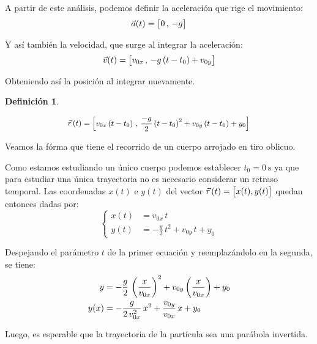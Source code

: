 \documentclass[a5paper,12pt,twoside]{book}
\newtheorem{defn}{{Definición}}[chapter]
\begin{document}
A partir de este análisis, podemos definir la aceleración que rige el movimiento:
\begin{equation*}
    \Vec{a}(t) = { \begin{bmatrix} 0 \, , \, -g \end{bmatrix} }
\end{equation*}

Y así también la velocidad, que surge al integrar la aceleración:
\begin{equation*}
    \Vec{v}(t) = { \begin{bmatrix} v_{0x} \, , \, -g \left(t-t_0\right) + v_{0y} \end{bmatrix} }
\end{equation*}

Obteniendo así la posición al integrar nuevamente.

\begin{mdframed}[style=MyFrame1]
    \begin{defn}
    \end{defn}
    \begin{equation*}
        \scale{0.92}{
        \xyz(t) = \sqb{v_{0x} \left(t-t_0\right) \, , \, \frac{-g}{2} \left(t-t_0\right)^2 + v_{0y} \left(t-t_0\right) + y_0}
        }
    \end{equation*}
\end{mdframed}

Veamos la fórma que tiene el recorrido de un cuerpo arrojado en tiro oblicuo.

Como estamos estudiando un único cuerpo podemos establecer $t_0=\SI{0}{\second}$ ya que para estudiar una única trayectoria no es necesario considerar un retraso temporal.
Las coordenadas $x(t)$ e $y(t)$ del vector $\vec{r}\hspace{0.05cm}(t) = { \begin{bmatrix} x(t),y(t) \end{bmatrix} }$ quedan entonces dadas por:
\begin{equation*}
    \left\{
    \begin{aligned}
        x(t) &= v_{0x} \, t
        \\
        y(t) &= -\frac{g}{2} \, t^2 + v_{0y} \, t + y_0
    \end{aligned}
    \right.
\end{equation*}

Despejando el parámetro $t$ de la primer ecuación y reemplazándolo en la segunda, se tiene:
\begin{align}
    y &= -\frac{g}{2} \, \left(\frac{x}{v_{0x}}\right)^2 + v_{0y} \left(\frac{x}{v_{0x}}\right) + y_0
    \notag
    \\
    y(x) &= -\frac{g}{2 \, v_{0x}^2} \, x^2 + \frac{v_{0y}}{v_{0x}} \, x + y_0
    \label{eqn:oblicuoCurva}
\end{align}

Luego, es esperable que la trayectoria de la partícula sea una parábola invertida.
\end{document}
